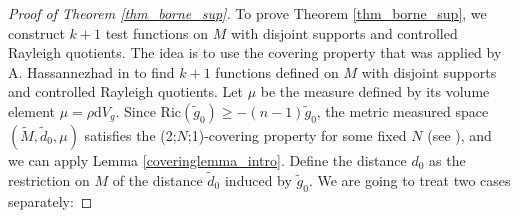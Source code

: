 \documentclass[12pt,reqno]{amsart}		%
\theoremstyle{plain}
\theoremstyle{definition}
\theoremstyle{remark}
\numberwithin{equation}{section}
\renewcommand{\d}{\mathrm{d}}
\begin{document}
\begin{proof}[Proof of Theorem \ref{thm_borne_sup}]

To prove Theorem \ref{thm_borne_sup}, we construct $k+1$ test functions on $M$ with disjoint supports and controlled Rayleigh quotients.
	The idea is to use the covering property that was applied by A. Hassannezhad in \cite[Theorem 2.1]{hassannezhad_2011} to find $k+1$ functions defined on $M$ with disjoint supports and controlled Rayleigh quotients. Let $\mu$ be the measure defined by its volume element $\mu=\rho \d V_{g}$. Since $\text{Ric}(\tilde{g}_0)\geqslant -(n-1)\tilde{g}_0$, the metric measured space $(\tilde{M},\tilde{d}_0,\mu)$ satisfies the (2;$N$;1)-covering property for some fixed $N$ (see \cite{hassannezhad_2011}), and we can apply Lemma \ref{coveringlemma_intro}.
%
%
Define the distance $d_{0}$ as the restriction on $M$ of the distance $\tilde{d}_0$ induced by $\tilde{g}_0$. We are going to treat two cases separately:


\end{proof}
\end{document}
